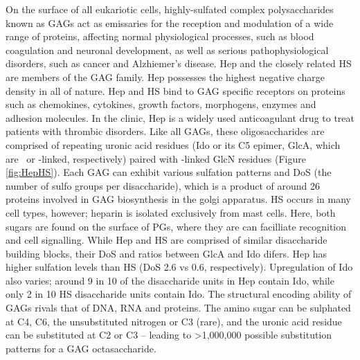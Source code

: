 \documentclass[journal=jctcce,manuscript=article]{achemso}
\begin{document}
{On the surface of all eukariotic cells, highly-sulfated complex polysaccharides known as \acp{GAG} act as emissaries for the reception and modulation of a wide range of proteins, affecting normal physiological processes, such as blood coagulation and neuronal development, as well as serious pathophysiological disorders, such as cancer and Alzhiemer's disease. 
\Ac{Hep} and the closely related \ac{HS} are members of the \ac{GAG} family. \Ac{Hep} possesses the highest negative charge density in all of nature. \ac{Hep} and \ac{HS} bind to \ac{GAG} specific receptors on proteins such as chemokines, cytokines, growth factors, morphogens, enzymes and adhesion molecules\cite{Murphy2007StructuralHeparin, Iozzo2001HeparanArena, Kreuger2006InteractionsSpecificity, Kowitsch2018MedicalReview}. 
In the clinic, \ac{Hep} is a widely used anticoagulant drug to treat patients with thrombic disorders.\cite{Liu2014ChemoenzymaticHeparin.}
Like all \acp{GAG}, these oligosaccharides are comprised of repeating uronic acid residues (\ac{Ido} or its C5 epimer, \ac{GlcA}, which are \textalpha~or  -linked, respectively) paired with -linked \ac{GlcN} residues (Figure \ref{fig:HepHS}). 
Each \ac{GAG} can exhibit various sulfation patterns and \ac{DoS} (the number of sulfo groups per disaccharide), which is a product of around 26 proteins involved in \ac{GAG} biosynthesis in the golgi apparatus.\cite{SoaresdaCosta2017SulfationDisorders, Varki2009BiologicalGlycans}
\ac{HS} occurs in many cell types, however; heparin is isolated exclusively from mast cells.\cite{Liu2014ChemoenzymaticHeparin., Gandhi2008TheProteins}
Here, both sugars are found on the surface of \acp{PG}, where they are can facilliate recognition and cell signalling. 
While \ac{Hep} and \ac{HS} are comprised of similar disaccharide building blocks, their \ac{DoS} and ratios between \ac{GlcA} and \ac{Ido} difers.
\ac{Hep} has higher sulfation levels than HS (\ac{DoS} 2.6 vs 0.6, respectively). 
Upregulation of \ac{Ido} also varies; around 9 in 10 of the disaccharide units in \ac{Hep} contain \ac{Ido}, while only 2 in 10 \ac{HS} disaccharide units contain \ac{Ido}. The structural encoding ability of \acp{GAG} rivals that of DNA, RNA and proteins.\cite{Gama2006SulfationActivity} 
The amino sugar can be sulphated at C4, C6, the unsubstituted nitrogen or C3 (rare), and the uronic acid residue can be substituted at C2 or C3 -- leading to \textgreater1,000,000 possible substitution patterns for a \ac{GAG} octasaccharide.\cite{Gandhi2008TheProteins, SoaresdaCosta2017SulfationDisorders,Gama2006SulfationActivity} 

}
\end{document}
